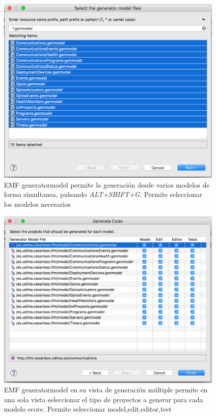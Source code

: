 \begin{figure}
    \centering
    \includegraphics[scale=0.4]{images/emf_capturas/genmodel_8.png}
    \sourcepropia{}
    \caption[Genmodel generación de proyectos desde varios modelos simultáneamente]{EMF generatormodel permite la generación desde varios modelos de forma simultanea, pulsando \textit{ALT+SHIFT+G}. Permite seleccionar los modelos necesarios}
    \label{fig:modelo_genmodel_paso8}
\end{figure}

\begin{figure}
    \centering
    \includegraphics[scale=0.4]{images/emf_capturas/genmodel_9.png}
    \sourcepropia{}
    \caption[Genmodel selección de tipo de proyecto multiple]{EMF generatormodel en su vista de generación múltiple permite en una sola vista seleccionar el tipo de proyectos a generar para cada modelo \gls{ecore}. Permite seleccionar model,edit,editor,test}
    \label{fig:modelo_genmodel_paso9}
\end{figure}



